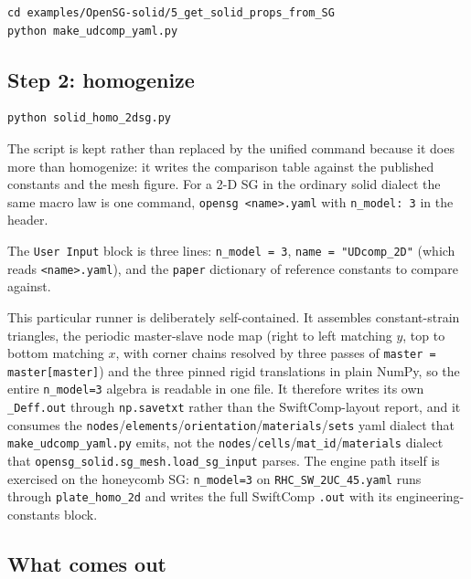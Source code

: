 \begin{lstlisting}[style=shellst]
cd examples/OpenSG-solid/5_get_solid_props_from_SG
python make_udcomp_yaml.py
\end{lstlisting}

\subsection{Step 2: homogenize}

\begin{lstlisting}[style=shellst]
python solid_homo_2dsg.py
\end{lstlisting}

The script is kept rather than replaced by the unified command because it does
more than homogenize: it writes the comparison table against the published
constants and the mesh figure. For a 2-D SG in the ordinary solid dialect the
same macro law is one command, \texttt{opensg <name>.yaml} with
\texttt{n\_model: 3} in the header.

The \texttt{User Input} block is three lines: \texttt{n\_model = 3},
\texttt{name = "UDcomp\_2D"} (which reads \texttt{<name>.yaml}), and the
\texttt{paper} dictionary of reference constants to compare against.

This particular runner is deliberately self-contained. It assembles
constant-strain triangles, the periodic master-slave node map (right to left
matching $y$, top to bottom matching $x$, with corner chains resolved by three
passes of \texttt{master = master[master]}) and the three pinned rigid
translations in plain NumPy, so the entire \texttt{n\_model=3} algebra is
readable in one file. It therefore writes its own \texttt{\_Deff.out} through
\texttt{np.savetxt} rather than the SwiftComp-layout report, and it consumes the
\texttt{nodes}/\texttt{elements}/\texttt{orientation}/\texttt{materials}/\texttt{sets}
yaml dialect that \texttt{make\_udcomp\_yaml.py} emits, not the
\texttt{nodes}/\texttt{cells}/\texttt{mat\_id}/\texttt{materials}
dialect that \texttt{opensg\_solid.sg\_mesh.load\_sg\_input} parses. The engine
path itself is exercised on the honeycomb SG: \texttt{n\_model=3} on
\texttt{RHC\_SW\_2UC\_45.yaml} runs through \texttt{plate\_homo\_2d} and writes
the full SwiftComp \texttt{.out} with its engineering-constants block.

\subsection{What comes out}

